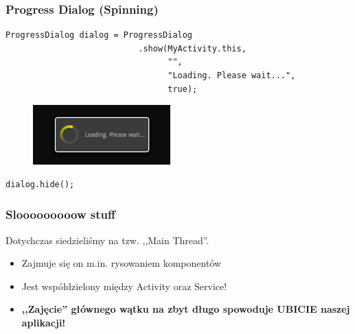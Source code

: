 \documentclass{beamer}
\begin{document}
% 

\begin{frame}[fragile]\frametitle{Progress Dialog (Spinning)}
\begin{lstlisting}
ProgressDialog dialog = ProgressDialog
                           .show(MyActivity.this, 
                                 "", 
                                 "Loading. Please wait...", 
                                 true);
\end{lstlisting}

\begin{figure}
 \centering
 \includegraphics[width=.5\textwidth]{images/dialog_progress_spinning}
\end{figure}

\pause

\begin{lstlisting}
dialog.hide();
\end{lstlisting}
\end{frame}

\begin{frame}\frametitle{Slooooooooow stuff}
Dotychczas siedzieliśmy na tzw. ,,Main Thread''.
\begin{itemize}
 \item Zajmuje się on m.in. rysowaniem komponentów
 \item Jest współdzielony między Activity oraz Service!
 \item \textbf{,,Zajęcie'' głównego wątku na zbyt długo spowoduje UBICIE naszej aplikacji!}
\end{itemize}
\end{frame}
\end{document}
